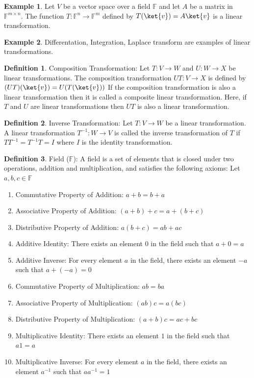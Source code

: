 \documentclass[12pt, oneside]{book}
\theoremstyle{definition}
\newtheorem{definition}{Definition}[section]
\theoremstyle{definition}
\newtheorem{example}{Example}[section]
\theoremstyle{remark}
\begin{document}
\begin{example}
    Let $V$ be a vector space over a field $\mathbb{F}$ and let $A$ be a matrix in $\mathbb{F}^{m\times n}$. The function $T:\mathbb{F}^{n}\rightarrow\mathbb{F}^{m}$ defined by $T(\ket{v})=A\ket{v}$ is a linear transformation.
\end{example}

\begin{example}
    Differentation, Integration, Laplace transform are examples of linear transformations.
\end{example}

\begin{definition}
    Composition Transformation: Let $T:V\rightarrow W$ and $U:W\rightarrow X$ be linear transformations. The composition transformation $UT:V\rightarrow X$ is defined by $(UT)(\ket{v})=U(T(\ket{v}))$
    If the composition transformation is also a linear transformation then it is called a composite linear transformation. Here, if $T$ and $U$ are linear transformations then $UT$ is also a linear transformation.
\end{definition}

\begin{definition}
    Inverse Transformation: Let $T:V\rightarrow W$ be a linear transformation. A linear transformation $T^{-1}:W\rightarrow V$ is called the inverse transformation of $T$ if $TT^{-1}=T^{-1}T=I$ where $I$ is the identity transformation.
\end{definition}

\begin{definition}
    Field ($\mathbb{F}$): A field is a set of elements that is closed under two operations, addition and multiplication, and satisfies the following axioms:
    Let $a,b,c\in\mathbb{F}$
    \begin{enumerate}
        \item Commutative Property of Addition: $a+b=b+a$
        \item Associative Property of Addition: $(a+b)+c=a+(b+c)$
        \item Distributive Property of Addition: $a(b+c)=ab+ac$
        \item Additive Identity: There exists an element $0$ in the field such that $a+0=a$
        \item Additive Inverse: For every element $a$ in the field, there exists an element $-a$ such that $a+(-a)=0$
        \item Commutative Property of Multiplication: $ab=ba$
        \item Associative Property of Multiplication: $(ab)c=a(bc)$
        \item Distributive Property of Multiplication: $(a+b)c=ac+bc$
        \item Multiplicative Identity: There exists an element $1$ in the field such that $a1=a$
        \item Multiplicative Inverse: For every element $a$ in the field, there exists an element $a^{-1}$ such that $aa^{-1}=1$
    \end{enumerate}
\end{definition}
\end{document}
